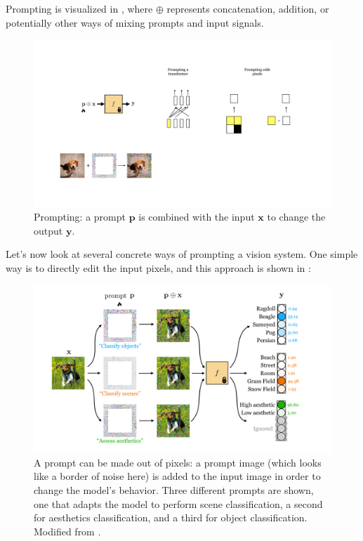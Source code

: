 Prompting is visualized in \fig{\ref{fig:transfer_learning:prompting}}, where $\oplus$ represents concatenation, addition, or potentially other ways of mixing prompts and input signals.
\begin{figure}[h!]
    \centerline{
    \includegraphics[width=0.35\linewidth]{./figures/transfer_learning/prompting.pdf}
    }
    \caption{Prompting: a prompt $\mathbf{p}$ is combined with the input $\mathbf{x}$ to change the output $\mathbf{y}$.}
    \label{fig:transfer_learning:prompting}
\end{figure}

Let's now look at several concrete ways of prompting a vision system. One simple way is to directly edit the input pixels, and this approach is shown in \fig{\ref{fig:transfer_learning:pixel_prompt}}:
\begin{figure}[h!]
    \centerline{
    \includegraphics[width=1.0\linewidth]{./figures/transfer_learning/vp_hyojin.pdf}
    }
    \caption{A prompt can be made out of pixels: a prompt image (which looks like a border of noise here) is added to the input image in order to change the model's behavior. Three different prompts are shown, one that adapts the model to perform scene classification, a second for aesthetics classification, and a third for object classification. Modified from \cite{bahng2022exploring}.}
    \label{fig:transfer_learning:pixel_prompt}
\end{figure}

